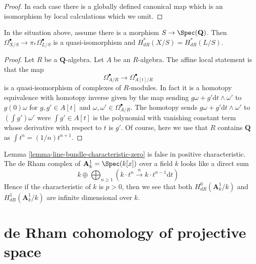 \begin{proof}
In each case there is a globally defined canonical map which
is an isomorphism by local calculations which we omit.
\end{proof}

\begin{lemma}
\label{lemma-line-bundle-characteristic-zero}
In the situation above, assume there is a morphism $S \to \Spec(\mathbf{Q})$.
Then $\Omega^\bullet_{X/S} \to \pi_*\Omega^\bullet_{L/S}$ is a
quasi-isomorphism and $H_{dR}^*(X/S) = H_{dR}^*(L/S)$.
\end{lemma}

\begin{proof}
Let $R$ be a $\mathbf{Q}$-algebra. Let $A$ be an $R$-algebra.
The affine local statement is that the map
$$
\Omega^\bullet_{A/R} \longrightarrow \Omega^\bullet_{A[t]/R}
$$
is a quasi-isomorphism of complexes of $R$-modules. In fact it is a
homotopy equivalence with homotopy inverse given by the map sending
$g \omega + g' \text{d}t \wedge \omega'$ to $g(0)\omega$ for
$g, g' \in A[t]$ and $\omega, \omega' \in \Omega^\bullet_{A/R}$.
The homotopy sends $g \omega + g' \text{d}t \wedge \omega'$
to $(\int g') \omega'$ were $\int g' \in A[t]$ is the polynomial
with vanishing constant term whose derivative with respect to $t$
is $g'$. Of course, here we use that $R$ contains $\mathbf{Q}$
as $\int t^n = (1/n)t^{n + 1}$.
\end{proof}

\begin{example}
\label{example-affine-line}
Lemma \ref{lemma-line-bundle-characteristic-zero} is
false in positive characteristic. The de Rham complex of
$\mathbf{A}^1_k = \Spec(k[x])$ over a field $k$ looks like a direct sum
$$
k \oplus
\bigoplus\nolimits_{n \geq 1}
(k \cdot t^n \xrightarrow{n}
k \cdot t^{n - 1} \text{d}t)
$$
Hence if the characteristic of $k$ is $p > 0$, then
we see that both $H^0_{dR}(\mathbf{A}^1_k/k)$ and
$H^1_{dR}(\mathbf{A}^1_k/k)$
are infinite dimensional over $k$.
\end{example}








\section{de Rham cohomology of projective space}
\label{section-projective-space}

